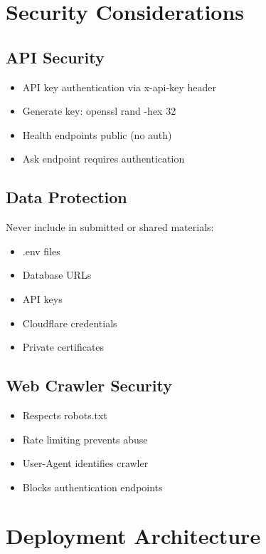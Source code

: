 \documentclass[12pt]{article}
\begin{document}
\section{Security Considerations}

\subsection{API Security}

\begin{itemize}
    \item API key authentication via x-api-key header
    \item Generate key: openssl rand -hex 32
    \item Health endpoints public (no auth)
    \item Ask endpoint requires authentication
\end{itemize}

\subsection{Data Protection}

Never include in submitted or shared materials:
\begin{itemize}
    \item .env files
    \item Database URLs
    \item API keys
    \item Cloudflare credentials
    \item Private certificates
\end{itemize}

\subsection{Web Crawler Security}

\begin{itemize}
    \item Respects robots.txt
    \item Rate limiting prevents abuse
    \item User-Agent identifies crawler
    \item Blocks authentication endpoints
\end{itemize}

\section{Deployment Architecture}
\end{document}
